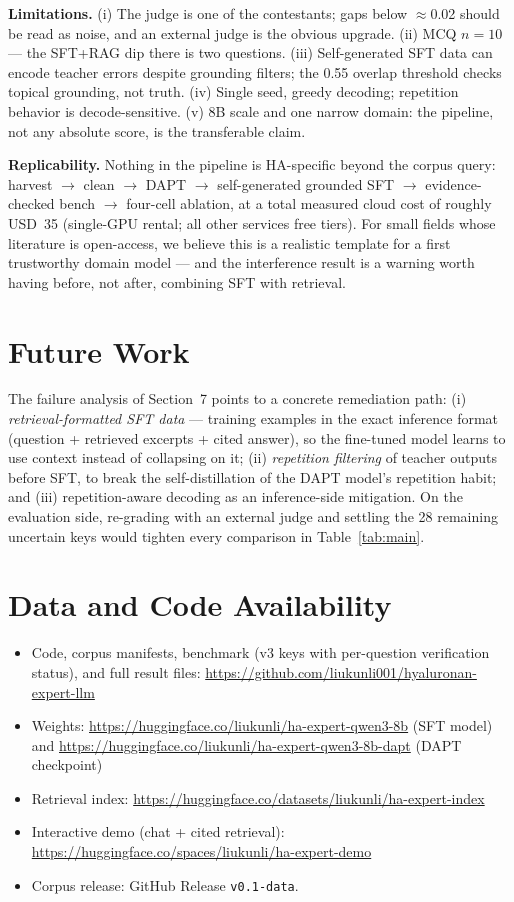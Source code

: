 \documentclass[11pt]{article}
\begin{document}
\textbf{Limitations.} (i) The judge is one of the contestants; gaps below
$\approx$0.02 should be read as noise, and an external judge is the
obvious upgrade. (ii) MCQ $n=10$ --- the SFT+RAG dip there is two
questions. (iii) Self-generated SFT data can encode teacher errors despite
grounding filters; the 0.55 overlap threshold checks topical grounding,
not truth. (iv) Single seed, greedy decoding; repetition behavior is
decode-sensitive. (v) 8B scale and one narrow domain: the pipeline, not
any absolute score, is the transferable claim.

\textbf{Replicability.} Nothing in the pipeline is HA-specific beyond the
corpus query: harvest $\rightarrow$ clean $\rightarrow$ DAPT $\rightarrow$
self-generated grounded SFT $\rightarrow$ evidence-checked bench
$\rightarrow$ four-cell ablation, at a total measured cloud cost of
roughly USD~35 (single-GPU rental; all other services free tiers). For
small fields whose literature is open-access, we believe this is a
realistic template for a first trustworthy domain model --- and the
interference result is a warning worth having before, not after, combining
SFT with retrieval.

\section{Future Work}

The failure analysis of Section~7 points to a concrete remediation path:
(i) \emph{retrieval-formatted SFT data} --- training examples in the exact
inference format (question + retrieved excerpts + cited answer), so the
fine-tuned model learns to use context instead of collapsing on it;
(ii) \emph{repetition filtering} of teacher outputs before SFT, to break
the self-distillation of the DAPT model's repetition habit; and
(iii) repetition-aware decoding as an inference-side mitigation. On the
evaluation side, re-grading with an external judge and settling the 28
remaining uncertain keys would tighten every comparison in
Table~\ref{tab:main}.

\section{Data and Code Availability}

\begin{itemize}
\item Code, corpus manifests, benchmark (v3 keys with per-question
verification status), and full result files:
\url{https://github.com/liukunli001/hyaluronan-expert-llm}
\item Weights: \url{https://huggingface.co/liukunli/ha-expert-qwen3-8b}
(SFT model) and
\url{https://huggingface.co/liukunli/ha-expert-qwen3-8b-dapt} (DAPT
checkpoint)
\item Retrieval index:
\url{https://huggingface.co/datasets/liukunli/ha-expert-index}
\item Interactive demo (chat + cited retrieval):
\url{https://huggingface.co/spaces/liukunli/ha-expert-demo}
\item Corpus release: GitHub Release \texttt{v0.1-data}.
\end{itemize}
\end{document}
